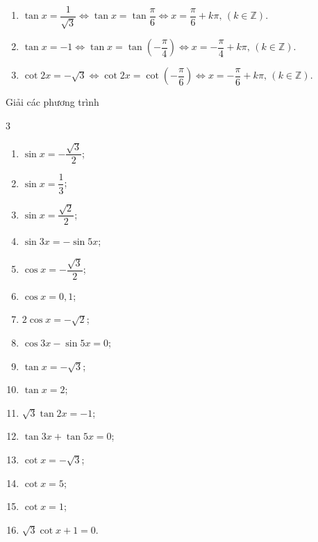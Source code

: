 \begin{bt}
{\begin{enumerate}
			\item $\tan x=\dfrac{1}{\sqrt{3}}\Leftrightarrow\tan x=\tan\dfrac{\pi}{6}\Leftrightarrow x=\dfrac{\pi}{6}+k\pi,\,(k\in\mathbb{Z})$.
			\item $\tan x=-1\Leftrightarrow\tan x=\tan\left(-\dfrac{\pi}{4}\right)\Leftrightarrow x=-\dfrac{\pi}{4}+k\pi,\,(k\in\mathbb{Z})$.
			\item $\cot2x=-\sqrt{3}\Leftrightarrow\cot2x=\cot\left(-\dfrac{\pi}{6}\right)\Leftrightarrow x=-\dfrac{\pi}{6}+k\pi,\,(k\in\mathbb{Z})$.
	\end{enumerate}}
\end{bt}

\begin{bt}%
	Giải các phương trình
	\begin{multicols}{3}
		\begin{enumerate}
			\item $\sin x=-\dfrac{\sqrt{3}}{2}$;
			\item $\sin x=\dfrac{1}{3}$;
			\item $\sin x=\dfrac{\sqrt{2}}{2}$;
			\item $\sin3x=-\sin5x$;
			\item $\cos x=-\dfrac{\sqrt{3}}{2}$;
			\item $\cos x=0{,}1$;
			\item $2\cos x=-\sqrt{2}$;
			\item $\cos3x-\sin5x=0$;
			\item $\tan x=-\sqrt{3}$;
			\item $\tan x=2$;
			\item $\sqrt{3}\tan2x=-1$;
			\item $\tan3x+\tan5x=0$;
			\item $\cot x=-\sqrt{3}$;
			\item $\cot x=5$;
			\item $\cot x=1$;
			\item $\sqrt{3}\cot x+1=0$.
		\end{enumerate}
	\end{multicols}
\end{bt}
